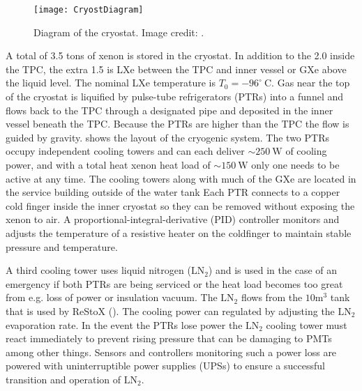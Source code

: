 \begin{figure}
\centering
\texttt{[image: CryostDiagram]}
\caption{Diagram of the cryostat.  Image credit: .}
\label{fig:xenon1t_cryo_cryostat_diagram}
\end{figure}

A total of 3.5 tons of xenon is stored in the cryostat.  In addition to the 2.0 inside the TPC, the extra 1.5 is LXe between the
TPC and inner vessel or GXe above the liquid level.  The nominal LXe temperature is $T_{0} = -96^{\circ}\ \mathrm{C}$.  Gas near the top of
the cryostat is liquified by pulse-tube refrigerators (PTRs) into a funnel and flows back to the TPC through a designated pipe and
deposited in the inner vessel beneath the TPC.  Because
the PTRs are higher than the TPC the flow is guided by gravity.   shows the layout of the
cryogenic
system.  The two PTRs occupy independent cooling towers and can each deliver ${\sim} 250\ \mathrm{W}$ of cooling power, and with
a total heat xenon heat load of ${\sim} 150\ \mathrm{W}$ only one needs to be active at any time.  The cooling towers along with much of
the
GXe are located in the service building outside of the water tank  Each PTR connects to a copper cold finger
inside the inner cryostat so they can be removed without exposing the xenon to air.  A proportional-integral-derivative (PID) controller
monitors and adjusts the temperature of a resistive heater on the coldfinger to maintain stable pressure and temperature.

A third cooling tower uses liquid nitrogen ($\mathrm{LN_2}$) and is used in the case of an emergency if both PTRs are being serviced or the
heat load becomes too great from e.g. loss of power or insulation vacuum.  The $\mathrm{LN_2}$ flows from the $10 \mathrm{m^3}$ tank that
is used by ReStoX ().  The cooling power can regulated by adjusting the $\mathrm{LN_2}$ evaporation rate.  In the event the PTRs
lose power the $\mathrm{LN_2}$ cooling tower must react immediately to prevent rising pressure that can be damaging to PMTs among other
things.  Sensors and controllers monitoring such a power loss are powered with uninterruptible power supplies (UPSs) to ensure a successful
transition and operation of $\mathrm{LN_2}$.

